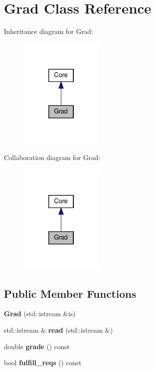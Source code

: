 \hypertarget{classGrad}{}\section{Grad Class Reference}
\label{classGrad}


Inheritance diagram for Grad\+:
\nopagebreak
\begin{figure}[H]
\begin{center}
\leavevmode
\includegraphics[width=118pt]{classGrad__inherit__graph}
\end{center}
\end{figure}


Collaboration diagram for Grad\+:
\nopagebreak
\begin{figure}[H]
\begin{center}
\leavevmode
\includegraphics[width=118pt]{classGrad__coll__graph}
\end{center}
\end{figure}
\subsection*{Public Member Functions}
\begin{DoxyCompactItemize}
\item 
\mbox{\label{classGrad_a683d203e0526d3926007681b7af7b0e5}} 
{\bfseries Grad} (std\+::istream \&is)
\item 
\mbox{\label{classGrad_ae3f9ebe99dfaa4ae86a87e457ae7a283}} 
std\+::istream \& {\bfseries read} (std\+::istream \&)
\item 
\mbox{\label{classGrad_aa481be2e8f7e4c16942221cd4931b431}} 
double {\bfseries grade} () const
\item 
\mbox{\label{classGrad_ae2bae0e60fbce15836f55a90d0fc2c0e}} 
bool {\bfseries fulfill\+\_\+reqs} () const
\end{DoxyCompactItemize}
